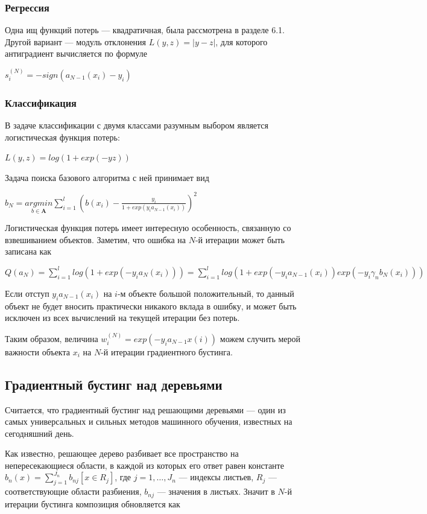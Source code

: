 \documentclass{article}
\begin{document}
\subsubsection{Регрессия}

Одна ищ функций потерь --- квадратичная, была рассмотрена в разделе 6.1. Другой вариант --- модуль отклонения $L(y,z) = |y-z|$, для которого антиградиент вычисляется по формуле 

$s_i^{(N)} = -sign(a_{N-1}(x_i)-y_i)$

\subsubsection{Классификация}

В задаче классификации с двумя классами разумным выбором является логистическая функция потерь:

$L(y,z) = log(1+exp(-yz))$

Задача поиска базового алгоритма с ней принимает вид

$b_N = \underset{b\in\mathbf{A}}{argmin}\sum_{i=1}^{l} (b(x_i) - \frac{y_i}{1+exp(y_ia_{N-1}(x_i))})^2$

Логистическая функция потерь имеет интересную особенность, связанную со взвешиванием объектов. Заметим, что ошибка на $N$-й итерации может быть записана как

$Q(a_N) = \sum_{i=1}^{l}log(1+exp(-y_ia_N(x_i))) = \sum_{i=1}^{l}log(1+exp(-y_ia_{N-1}(x_i))exp(-y_i \gamma_n b_N(x_i)))$

Если отступ $y_ia_{N-1}(x_i)$ на $i$-м объекте большой положительный, то данный объект не будет вносить практически никакого вклада в ошибку, и может быть исключен из всех вычислений на текущей итерации без потерь.

Таким образом, величина $w_i^{(N)} = exp(-y_ia_{N-1}x(i))$ можем случить мерой важности объекта $x_i$ на $N$-й итерации градиентного бустинга.


\subsection{Градиентный бустинг над деревьями}

Считается, что градиентный бустинг над решающими деревьями --- один из самых универсальных и сильных методов машинного обучения, известных на сегодняшний день.

Как известно, решающее дерево разбивает все пространство на непересекающиеся области, в каждой из которых его ответ равен константе $b_n(x) = \sum_{j=1}^{J_n} b_{nj}[x\in R_j]$, где $j=1,\ldots,J_n$ --- индексы листьев, $R_{j}$ --- соответствующие области разбиения, $b_{nj}$ --- значения в листьях. Значит в $N$-й итерации бустинга композиция обновляется как
\end{document}
